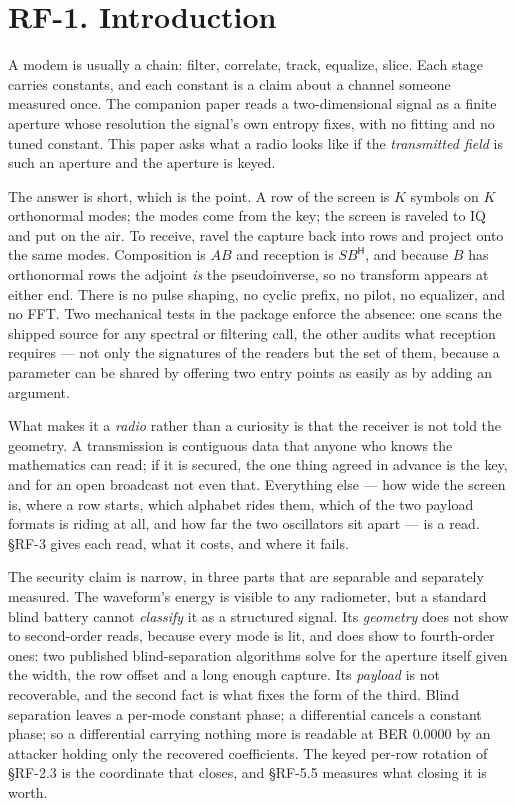 \documentclass[10pt,letterpaper,twocolumn]{article}
\begin{document}
\section{RF-1. Introduction}\label{rf-1-introduction}

A modem is usually a chain: filter, correlate, track, equalize, slice. Each stage carries constants, and each constant is a claim about a channel someone measured once. The companion paper reads a two-dimensional signal as a finite aperture whose resolution the signal's own entropy fixes, with no fitting and no tuned constant. This paper asks what a radio looks like if the \emph{transmitted field} is such an aperture and the aperture is keyed.

The answer is short, which is the point. A row of the screen is \(K\) symbols on \(K\) orthonormal modes; the modes come from the key; the screen is raveled to IQ and put on the air. To receive, ravel the capture back into rows and project onto the same modes. Composition is \(A B\) and reception is \(S B^{\mathsf H}\), and because \(B\) has orthonormal rows the adjoint \emph{is} the pseudoinverse, so no transform appears at either end. There is no pulse shaping, no cyclic prefix, no pilot, no equalizer, and no FFT. Two mechanical tests in the package enforce the absence: one scans the shipped source for any spectral or filtering call, the other audits what reception requires --- not only the signatures of the readers but the set of them, because a parameter can be shared by offering two entry points as easily as by adding an argument.

What makes it a \emph{radio} rather than a curiosity is that the receiver is not told the geometry. A transmission is contiguous data that anyone who knows the mathematics can read; if it is secured, the one thing agreed in advance is the key, and for an open broadcast not even that. Everything else --- how wide the screen is, where a row starts, which alphabet rides them, which of the two payload formats is riding at all, and how far the two oscillators sit apart --- is a read. §RF-3 gives each read, what it costs, and where it fails.

The security claim is narrow, in three parts that are separable and separately measured. The waveform's energy is visible to any radiometer, but a standard blind battery cannot \emph{classify} it as a structured signal. Its \emph{geometry} does not show to second-order reads, because every mode is lit, and does show to fourth-order ones: two published blind-separation algorithms solve for the aperture itself given the width, the row offset and a long enough capture. Its \emph{payload} is not recoverable, and the second fact is what fixes the form of the third. Blind separation leaves a per-mode constant phase; a differential cancels a constant phase; so a differential carrying nothing more is readable at BER 0.0000 by an attacker holding only the recovered coefficients. The keyed per-row rotation of §RF-2.3 is the coordinate that closes, and §RF-5.5 measures what closing it is worth.
\end{document}
